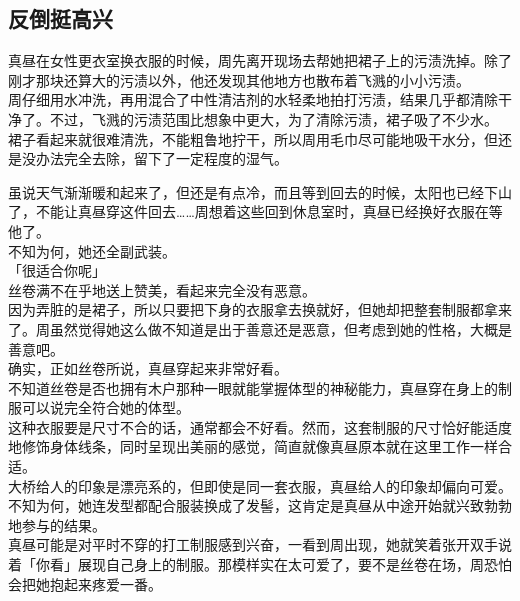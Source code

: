 \subsection{反倒挺高兴}

真昼在女性更衣室换衣服的时候，周先离开现场去帮她把裙子上的污渍洗掉。除了刚才那块还算大的污渍以外，他还发现其他地方也散布着飞溅的小小污渍。\\

周仔细用水冲洗，再用混合了中性清洁剂的水轻柔地拍打污渍，结果几乎都清除干净了。不过，飞溅的污渍范围比想象中更大，为了清除污渍，裙子吸了不少水。\\

裙子看起来就很难清洗，不能粗鲁地拧干，所以周用毛巾尽可能地吸干水分，但还是没办法完全去除，留下了一定程度的湿气。

虽说天气渐渐暖和起来了，但还是有点冷，而且等到回去的时候，太阳也已经下山了，不能让真昼穿这件回去……周想着这些回到休息室时，真昼已经换好衣服在等他了。\\

不知为何，她还全副武装。\\

「很适合你呢」\\

丝卷满不在乎地送上赞美，看起来完全没有恶意。\\

因为弄脏的是裙子，所以只要把下身的衣服拿去换就好，但她却把整套制服都拿来了。周虽然觉得她这么做不知道是出于善意还是恶意，但考虑到她的性格，大概是善意吧。\\

确实，正如丝卷所说，真昼穿起来非常好看。\\

不知道丝卷是否也拥有木户那种一眼就能掌握体型的神秘能力，真昼穿在身上的制服可以说完全符合她的体型。\\

这种衣服要是尺寸不合的话，通常都会不好看。然而，这套制服的尺寸恰好能适度地修饰身体线条，同时呈现出美丽的感觉，简直就像真昼原本就在这里工作一样合适。\\

大桥给人的印象是漂亮系的，但即使是同一套衣服，真昼给人的印象却偏向可爱。不知为何，她连发型都配合服装换成了发髻，这肯定是真昼从中途开始就兴致勃勃地参与的结果。\\

真昼可能是对平时不穿的打工制服感到兴奋，一看到周出现，她就笑着张开双手说着「你看」展现自己身上的制服。那模样实在太可爱了，要不是丝卷在场，周恐怕会把她抱起来疼爱一番。\\

